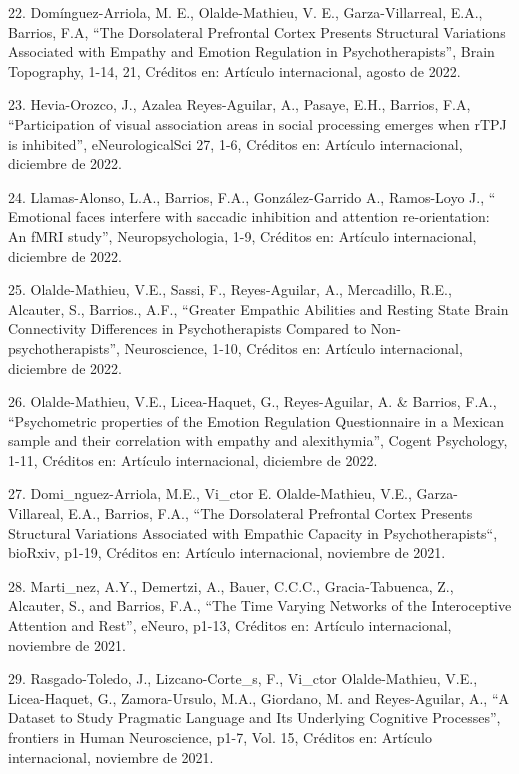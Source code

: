 22. Domínguez-Arriola, M. E., Olalde-Mathieu, V. E., Garza-Villarreal, E.A., Barrios, F.A, “The Dorsolateral Prefrontal Cortex 
Presents Structural Variations Associated with Empathy and Emotion Regulation in Psychotherapists”, Brain Topography, 1-14, 21, 
Créditos en: Artículo internacional, agosto de 2022.

23. Hevia-Orozco, J., Azalea Reyes-Aguilar, A., Pasaye, E.H., Barrios, F.A, “Participation of visual association areas in 
social processing emerges when rTPJ is inhibited”, eNeurologicalSci 27, 1-6, Créditos en: Artículo internacional, diciembre de 
2022.

24. Llamas-Alonso, L.A., Barrios, F.A., González-Garrido A., Ramos-Loyo J., “ Emotional faces interfere with saccadic 
inhibition and attention re-orientation: An fMRI study”, Neuropsychologia, 1-9, Créditos en: Artículo internacional, diciembre 
de 2022.

25. Olalde-Mathieu, V.E., Sassi, F., Reyes-Aguilar, A., Mercadillo, R.E., Alcauter, S., Barrios., A.F., “Greater Empathic 
Abilities and Resting State Brain Connectivity Differences in Psychotherapists Compared to Non-psychotherapists”, Neuroscience, 
1-10, Créditos en: Artículo internacional, diciembre de 2022.

26. Olalde-Mathieu, V.E., Licea-Haquet, G., Reyes-Aguilar, A. & Barrios, F.A., “Psychometric properties of the Emotion 
Regulation Questionnaire in a Mexican sample and their correlation with empathy and alexithymia”, Cogent Psychology, 1-11, 
Créditos en: Artículo internacional, diciembre de 2022.

27. Domi_nguez-Arriola, M.E., Vi_ctor E. Olalde-Mathieu, V.E., Garza-Villareal, E.A., Barrios, F.A., “The Dorsolateral 
Prefrontal Cortex Presents Structural Variations Associated with Empathic Capacity in Psychotherapists“, bioRxiv, p1-19, 
Créditos en: Artículo internacional, noviembre de 2021.

28. Marti_nez, A.Y., Demertzi, A., Bauer, C.C.C., Gracia-Tabuenca, Z., Alcauter, S., and Barrios, F.A., “The Time Varying 
Networks of the Interoceptive Attention and Rest”, eNeuro, p1-13, Créditos en: Artículo internacional, noviembre de 2021.

29. Rasgado-Toledo, J., Lizcano-Corte_s, F., Vi_ctor Olalde-Mathieu, V.E., Licea-Haquet, G., Zamora-Ursulo, M.A., Giordano, M. 
and Reyes-Aguilar, A., “A Dataset to Study Pragmatic Language and Its Underlying Cognitive Processes”, frontiers in Human 
Neuroscience, p1-7, Vol. 15, Créditos en: Artículo internacional, noviembre de 2021.

